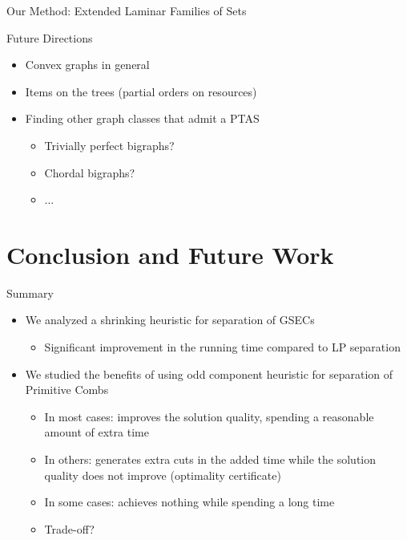 \documentclass[10pt]{beamer}
\begin{document}
\begin{frame}{Our Method: Extended Laminar Families of Sets}
\end{frame}

\begin{frame}{Future Directions}
	\begin{itemize}
    	\item<1-> Convex graphs in general
        \item<2-> Items on the trees (partial orders on resources)
        \item<3-> Finding other graph classes that admit a PTAS
        	\begin{itemize}
            	\item<4-> Trivially perfect bigraphs?
                \item<5-> Chordal bigraphs?
                \item<6-> $\ldots$
            \end{itemize}
    \end{itemize}
\end{frame}




\section{Conclusion and Future Work}

\begin{frame}{Summary}
\begin{itemize}
\item<1-> We analyzed a shrinking heuristic for separation of GSECs
	\begin{itemize}
	\item<2-> \alert{Significant improvement} in the running time compared to LP separation
	\end{itemize}
\item<3-> We studied the benefits of using odd component heuristic for separation of Primitive Combs
	\begin{itemize}
	\item<4-> In most cases: \alert{improves} the solution quality, spending a reasonable amount of extra time
	\item<5-> In others: generates extra cuts in the added time while the solution quality does not improve (\alert{optimality certificate})
	\item<6-> In some cases: achieves \alert{nothing} while spending a long time
	\item<7-> Trade-off?
	\end{itemize}
\end{itemize}
\end{frame}
\end{document}
